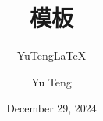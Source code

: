 \documentclass[lang=cn,10pt]{elegantbook}
\title{模板}
\subtitle{YuTeng\LaTeX{}}
\author{Yu Teng}
\institute{和光同尘}
\date{December 29, 2024}
\begin{document}
\maketitle
\frontmatter

\tableofcontents

\mainmatter

\chapter{}

\section{}

\subsection{}


\chapter{}

\section{}
\end{document}
